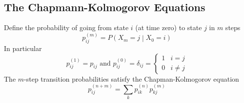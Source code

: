 \documentclass[11pt]{article}
\theoremstyle{definition}
\begin{document}
\subsection{The Chapmann-Kolmogorov Equations}
Define the probability of going from state $i$ (at time zero) to state $j$ in $m$ steps
\begin{equation*}
	p_{ij}^{(m)} = P\left( X_m = j \middle| X_0 = i \right)
\end{equation*}
In particular
\begin{equation*}
	p_{ij}^{(1)} = p_{ij}\text{ and } p_{ij}^{(0)} = \delta_{ij} = \left\{\begin{matrix}
	1 & i=j\\
	0 & i\neq j
	\end{matrix}
	\right.
\end{equation*}
The $m$-step transition probabilities satisfy the Chapman-Kolmogorov equation
\begin{equation*}
	p_{ij}^{(n+m)} = \sum_{k} p_{ik}^{(n)} p_{kj}^{(m)}
\end{equation*}
\end{document}
